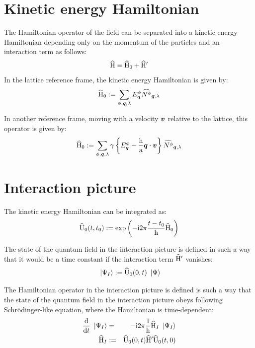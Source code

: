 \documentclass[10pt,a4paper,twoside,openany]{book}
\begin{document}
\section{Kinetic energy Hamiltonian}
\label{Kinetic energy Hamiltonian}

The Hamiltonian operator of the field can be separated into a kinetic energy Hamiltonian depending only on the momentum of the particles and an interaction term as follows:
\begin{equation*}
\widehat{\mathrm H} = \widehat{\mathrm H}_0 + \widehat{\mathrm H}'
\end{equation*}
In the lattice reference frame, the kinetic energy Hamiltonian is given by:
\begin{equation*}
\widehat{\mathrm H}_0 := \sum_{\phi,\boldsymbol{q},\lambda} E^{\phi}_{\boldsymbol{q}} \widehat{N^{\phi}}_{{\boldsymbol{q}}, {\lambda}}
\end{equation*}

In another reference frame, moving with a velocity $\boldsymbol{v}$ relative to the lattice, this operator is given by:
\begin{equation*}
\widehat{\mathrm H}_0 := \sum_{\phi,\boldsymbol{q},\lambda} \gamma \left\{ E^{\phi}_{\boldsymbol{q}} - \frac {\mathrm h} {\mathrm a} \boldsymbol{q} \cdot \boldsymbol{v} \right\} \widehat{N^{\phi}}_{{\boldsymbol{q}}, {\lambda}}
\end{equation*}

\section{Interaction picture}

The kinetic energy Hamiltonian can be integrated as:
\begin{equation*}
\widehat{\mathrm U}_0({t},{t_0}) := \mathrm{exp} \left( {- \mathrm{i} 2 \pi \frac{t - t_0} {\mathrm h} \widehat{\mathrm H}_0} \right)
\end{equation*}

The state of the quantum field in the interaction picture is defined in such a way that it would be a time constant if the interaction term $\widehat{\mathrm H}'$ vanishes:
\begin{equation*}
\ \left|{\Psi_I}\right\rangle := \widehat{\mathrm U}_0({0},{t}) \ \left|{\Psi}\right\rangle
\end{equation*}

The Hamiltonian operator in the interaction picture is defined is such a way that the state of the quantum field in the interaction picture obeys following Schrödinger-like equation, where the Hamiltonian is time-dependent:
\begin{eqnarray*}
\frac{\mathrm d}{\mathrm dt} \ \left|{\Psi_I}\right\rangle & = & -\mathrm{i} 2 \pi \frac 1 {\mathrm h} \widehat{\mathrm H}_I \ \left|{\Psi_I}\right\rangle \\
\widehat{\mathrm H}_I & := & \widehat{\mathrm U}_0({0},{t}) \widehat{\mathrm H}' \widehat{\mathrm U}_0({t},{0})
\end{eqnarray*}
\end{document}
